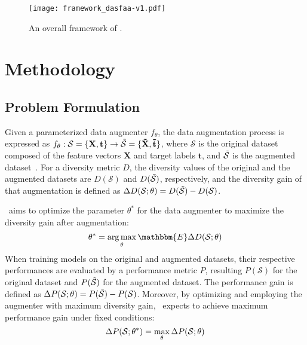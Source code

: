 \begin{figure*}[htbp]
    \centering
    \vspace{-4mm}
    \texttt{[image: framework\_dasfaa-v1.pdf]}
    \vspace{-2mm}
    \caption{An overall framework of \Methodnamec.}
    \label{fig:framework}
    \vspace{-3mm}
\end{figure*}


\vspace{-4mm}
\section{Methodology}
\subsection{Problem Formulation}

Given a parameterized data augmenter \(f_\theta\), the data augmentation process is expressed as \(f_\theta: \mathcal{S} = \{\mathbf{X}, \mathbf{t}\} \rightarrow \mathcal{\Tilde{S}} = \{\mathbf{\Tilde{X}}, \mathbf{\Tilde{t}}\} \), where \(\mathcal{S}\) is the original dataset composed of the feature vectors \(\mathbf{X}\) and target labels \(\mathbf{t}\), and \(\mathcal{\Tilde{S}}\) is the augmented dataset~\cite{wang2024comprehensive}. 
For a diversity metric \(D\), the diversity values of the original and the augmented datasets are \(D(\mathcal{S})\) and \(D(\mathcal{\Tilde{S}})\), respectively, and the diversity gain of that augmentation is defined as \(\Delta D(\mathcal{S}; \theta) = D(\mathcal{\Tilde{S}}) - D(\mathcal{S})\).

\Methodnamea~aims to optimize the parameter \(\theta^{\ast}\) for the data augmenter to maximize the diversity gain after augmentation:
\begin{equation}
\vspace{-3mm}
\theta^{\ast} = \mathop{\arg \max}_{\theta} \mathbbm{E} \Delta D(\mathcal{S}; \theta)
\end{equation}
When training models on the original and augmented datasets, their respective performances are evaluated by a performance metric \(P\), resulting \(P(\mathcal{S})\) for the original dataset and \(P(\mathcal{\Tilde{S}})\) for the augmented dataset. 
The performance gain is defined as \(\Delta P(\mathcal{S}; \theta) = P(\mathcal{\Tilde{S}}) - P(\mathcal{S})\).  
Moreover, by optimizing and employing the augmenter with maximum diversity gain, \Methodnamec~expects to achieve maximum performance gain under fixed conditions: 
\begin{equation}
\vspace{-3mm}
\Delta P(\mathcal{S}; \theta^{\ast}) = \mathop{\max}_{\theta} \Delta P(\mathcal{S}; \theta)
\end{equation}


